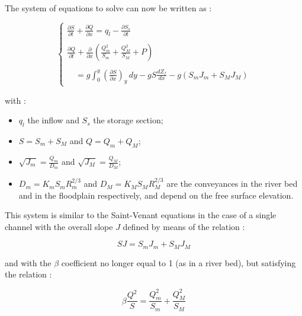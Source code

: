 \hspace*{1cm}

The system of equations to solve can now be written as :

\begin{equation}
 \label{SyEQ}
 \left \lbrace
  \begin{array}{l}
    \frac{\partial S}{\partial t} + \frac{\partial Q}{\partial x} = q_l - \frac{\partial S_s}{\partial t} \\
    \\
    \frac{\partial Q}{\partial t} + \frac{\partial}{\partial x} \left ( \frac{Q_{m}^2}{S_m} + \frac{Q_{M}^2}{S_M} + P \right ) \\
    \\
    \quad = g \int_{0}^y \left ( \frac{\partial S}{\partial x}\right )_y \, dy - g S \frac{d Z_f}{d x} - g (S_m J_m + S_M J_M)
  \end{array}
 \right.
\end{equation}

with :

\begin{itemize}
 \item $q_l$ the inflow and $S_s$ the storage section;
 \item $S = S_m + S_M$ and $Q = Q_m + Q_M$;
 \item $\sqrt{J_m} = \frac{Q_m}{D_m}$ and $\sqrt{J_M} = \frac{Q_M}{D_M}$;
 \item $D_m = K_m S_m R_{m}^{2/3}$ and $D_M = K_M S_M R_{M}^{2/3}$ are the conveyances in the river bed and in the floodplain respectively, and depend on the free surface elevation.
\end{itemize}

\vspace{0.5cm}

This system is similar to the Saint-Venant equations in the case of a single channel with the overall slope $J$ defined by means of the relation :

\begin{equation}
 S J = S_m J_m + S_M J_M
\end{equation}

\vspace{0.5cm}

and with the $\beta$ coefficient no longer equal to 1 (as in a river bed), but satisfying the relation :

\begin{equation}
 \beta \frac{Q^2}{S} = \frac{Q_{m}^2}{S_m} + \frac{Q_{M}^2}{S_M}
\end{equation}

